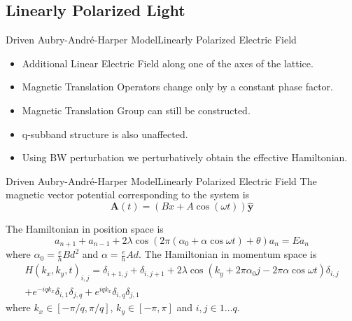 \documentclass{beamer}
\begin{document}
\subsection{Linearly Polarized Light}
\begin{frame}{Driven Aubry-Andr\'e-Harper Model}{Linearly Polarized Electric Field}
\begin{itemize}
 \item Additional Linear Electric Field along one of the axes of the lattice.
 \item Magnetic Translation Operators change only by a constant phase factor.
 \item Magnetic Translation Group can still be constructed.
 \item q-subband structure is also unaffected.
 \item Using BW perturbation we perturbatively obtain the effective Hamiltonian.
\end{itemize}
\end{frame}

\begin{frame}{Driven Aubry-Andr\'e-Harper Model}{Linearly Polarized Electric Field}
 The magnetic vector potential corresponding to the system is\footnotesize
\begin{equation*}
 \mathbf{A}(t) = (Bx + A\cos(\omega t)) \hat{\mathbf{y}}
\end{equation*}\normalsize

The Hamiltonian in position space is
\begin{equation}
 a_{n+1} + a_{n-1} + 2\lambda\cos(2\pi(\alpha_0 + \alpha \cos{\omega t}) + \theta) a_{n} = E a_{n}
\end{equation} where $\alpha_0 = \frac{e}{h}Bd^2$ and $\alpha = \frac{e}{h}Ad$.
The Hamiltonian in momentum space is
\footnotesize\begin{equation}
\begin{split}
 H(k_x, k_y, t)_{i,j} = \delta_{i+1,j} + \delta_{i,j+1} + 2\lambda\cos(k_y + 2\pi\alpha_0 j - 2\pi\alpha \cos{\omega t}) \delta_{i,j} \\+ e^{-iqk_x} \delta_{i,1}\delta_{j,q} + e^{iqk_x} \delta_{i,q}\delta_{j,1}
\end{split} 
\end{equation} where $k_x \in [-\pi/q, \pi/q]$, $k_y \in [-\pi,\pi]$ and $i,j \in 1\dots q$.\normalsize
\end{frame}
\end{document}
